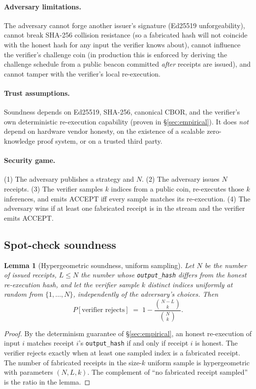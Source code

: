 \documentclass[10pt]{article}
\newtheorem{lemma}{Lemma}
\begin{document}
\paragraph{Adversary limitations.} The adversary cannot forge another issuer's signature (Ed25519 unforgeability), cannot break SHA-256 collision resistance (so a fabricated hash will not coincide with the honest hash for any input the verifier knows about), cannot influence the verifier's challenge coin (in production this is enforced by deriving the challenge schedule from a public beacon committed \emph{after} receipts are issued), and cannot tamper with the verifier's local re-execution.

\paragraph{Trust assumptions.} Soundness depends on Ed25519, SHA-256, canonical CBOR, and the verifier's own deterministic re-execution capability (proven in \S\ref{sec:empirical}). It does \emph{not} depend on hardware vendor honesty, on the existence of a scalable zero-knowledge proof system, or on a trusted third party.

\paragraph{Security game.} (1) The adversary publishes a strategy and $N$. (2) The adversary issues $N$ receipts. (3) The verifier samples $k$ indices from a public coin, re-executes those $k$ inferences, and emits ACCEPT iff every sample matches its re-execution. (4) The adversary wins if at least one fabricated receipt is in the stream and the verifier emits ACCEPT.

\subsection{Spot-check soundness}

\begin{lemma}[Hypergeometric soundness, uniform sampling]
\label{lem:hyper}
Let $N$ be the number of issued receipts, $L \le N$ the number whose \texttt{output\_hash} differs from the honest re-execution hash, and let the verifier sample $k$ distinct indices uniformly at random from $\{1, \dots, N\}$, independently of the adversary's choices. Then
\[
P[\text{verifier rejects}] \;=\; 1 - \frac{\binom{N - L}{k}}{\binom{N}{k}}.
\]
\end{lemma}

\begin{proof}
By the determinism guarantee of \S\ref{sec:empirical}, an honest re-execution of input $i$ matches receipt $i$'s \texttt{output\_hash} if and only if receipt $i$ is honest. The verifier rejects exactly when at least one sampled index is a fabricated receipt. The number of fabricated receipts in the size-$k$ uniform sample is hypergeometric with parameters $(N, L, k)$. The complement of ``no fabricated receipt sampled'' is the ratio in the lemma.
\end{proof}
\end{document}
